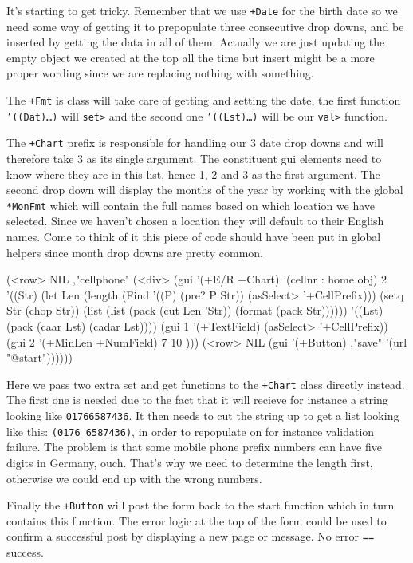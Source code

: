 It's starting to get tricky. Remember that we use \texttt{+Date} for
the birth date so we need some way of getting it to prepopulate three
consecutive drop downs, and be inserted by getting the data in all of
them. Actually we are just updating the empty object we created at the
top all the time but insert might be a more proper wording since we
are replacing nothing with something.

The \texttt{+Fmt} is class will take care of getting and setting the
date, the first function \texttt{'((Dat)\dots{})} will \texttt{set>}
and the second one \texttt{'((Lst)\dots{})} will be our \texttt{val>}
function.

The \texttt{+Chart} prefix is responsible for handling our 3 date drop
downs and will therefore take 3 as its single argument. The
constituent gui elements need to know where they are in this list,
hence 1, 2 and 3 as the first argument. The second drop down will
display the months of the year by working with the global
\texttt{*MonFmt} which will contain the full names based on which
location we have selected. Since we haven't chosen a location they
will default to their English names. Come to think of it this piece of
code should have been put in global helpers since month drop downs are
pretty common.

\begin{wideverbatim}
(<row> NIL ,"cellphone" 
   (<div> 
      (gui '(+E/R +Chart) '(cellnr : home obj) 2 
         '((Str)
             (let Len 
                (length 
                   (Find '((P) (pre? P Str)) (asSelect> '+CellPrefix)))
                (setq Str (chop Str))
                (list 
                   (list (pack (cut Len 'Str)) (format (pack Str))))))
         '((Lst) (pack (caar Lst) (cadar Lst))))
      (gui 1 '(+TextField) (asSelect> '+CellPrefix))
      (gui 2 '(+MinLen +NumField) 7 10 )))
(<row> NIL (gui '(+Button) ,"save" '(url "@start"))))))
\end{wideverbatim}

Here we pass two extra set and get functions to the \texttt{+Chart}
class directly instead. The first one is needed due to the fact that
it will recieve for instance a string looking like
\texttt{01766587436}. It then needs to cut the string up to get a list
looking like this: \texttt{(0176 6587436)}, in order to repopulate on
for instance validation failure. The problem is that some mobile phone
prefix numbers can have five digits in Germany, ouch. That's why we
need to determine the length first, otherwise we could end up with the
wrong numbers.

Finally the \texttt{+Button} will post the form back to the start
function which in turn contains this function. The error logic at the
top of the form could be used to confirm a successful post by
displaying a new page or message. No error \texttt{==} success.

